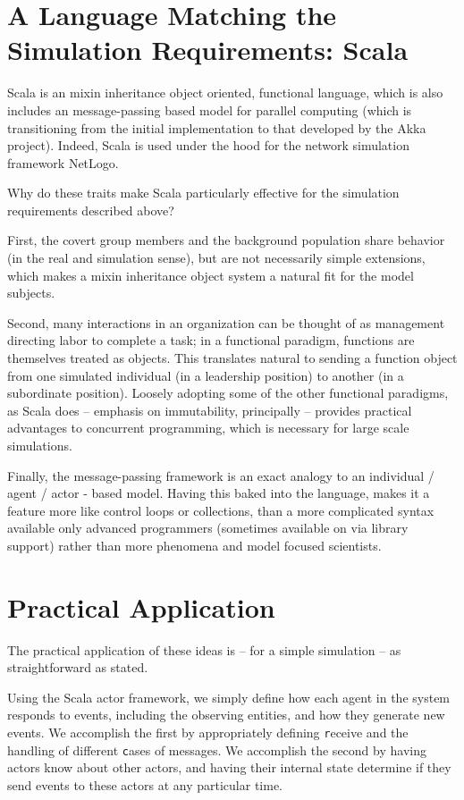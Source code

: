 \documentclass{article}
\begin{document}
\section*{A Language Matching the Simulation Requirements: Scala}
Scala is an mixin inheritance object oriented, functional language, which is also includes an message-passing based model for parallel computing (which is transitioning from the initial implementation to that developed by the Akka project).  Indeed, Scala is used under the hood for the network simulation framework NetLogo.

Why do these traits make Scala particularly effective for the simulation requirements described above?  

First, the covert group members and the background population share behavior (in the real and simulation sense), but are not necessarily simple extensions, which makes a mixin inheritance object system a natural fit for the model subjects.

Second, many interactions in an organization can be thought of as management directing labor to complete a task; in a functional paradigm, functions are themselves treated as objects.  This translates natural to sending a function object from one simulated individual (in a leadership position) to another (in a subordinate position).  Loosely adopting some of the other functional paradigms, as Scala does -- emphasis on immutability, principally -- provides practical advantages to concurrent programming, which is necessary for large scale simulations.

Finally, the message-passing framework is an exact analogy to an individual / agent / actor - based model.  Having this baked into the language, makes it a feature more like control loops or collections, than a more complicated syntax available only advanced programmers (sometimes available on via library support) rather than more phenomena and model focused scientists.

\section*{Practical Application}
The practical application of these ideas is -- for a simple simulation -- as straightforward as stated.

Using the Scala actor framework, we simply define how each agent in the system responds to events, including the observing entities, and how they generate new events.  We accomplish the first by appropriately defining {\texttt receive} and the handling of different {\texttt case}s of messages.  We accomplish the second by having actors know about other actors, and having their internal state determine if they send events to these actors at any particular time.
\end{document}
